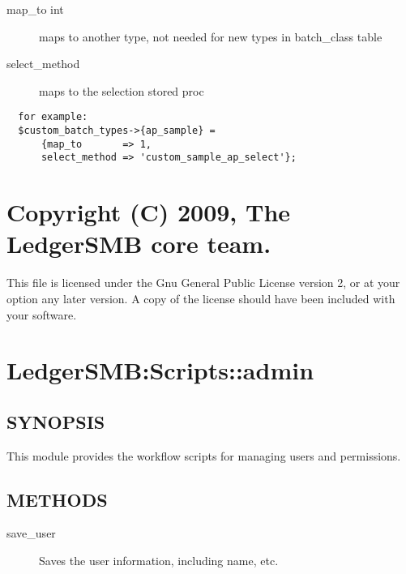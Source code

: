 \begin{description}
\begin{description}
\item[{map\_to int}] \mbox{}

maps to another type, not needed for new types in batch\_class table


\item[{select\_method}] \mbox{}

maps to the selection stored proc

\end{description}
\begin{verbatim}
  for example:
  $custom_batch_types->{ap_sample} = 
      {map_to       => 1, 
      select_method => 'custom_sample_ap_select'};
\end{verbatim}
\section{Copyright (C) 2009, The LedgerSMB core team.\label{Copyright_C_2009_The_LedgerSMB_core_team_}}


This file is licensed under the Gnu General Public License version 2, or at your
option any later version.  A copy of the license should have been included with
your software.

\section{LedgerSMB:Scripts::admin\label{LedgerSMB:Scripts::admin}}




\subsection*{SYNOPSIS\label{LedgerSMB:Scripts::admin_SYNOPSIS}}


This module provides the workflow scripts for managing users and permissions.

\subsection*{METHODS\label{LedgerSMB:Scripts::admin_METHODS}}
\begin{description}

\item[{save\_user}] \mbox{}

Saves the user information, including name, etc.




\end{description}
\end{description}
